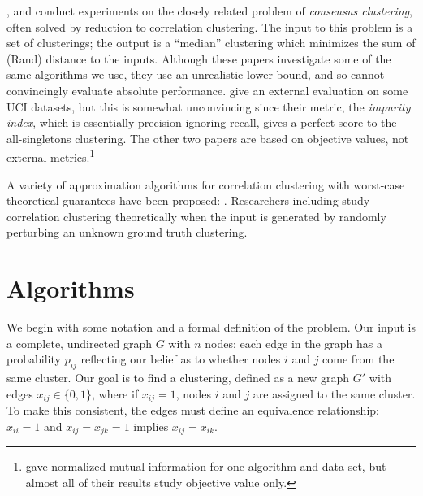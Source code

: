 \documentclass[11pt]{article}
\begin{document}
,  and 
conduct experiments on the closely related problem of \emph{consensus
  clustering}, often solved by reduction to correlation
clustering. The input to this problem is a set of clusterings; the
output is a ``median'' clustering which minimizes the sum of (Rand)
distance to the inputs. Although these papers investigate some of the
same algorithms we use, they use an unrealistic lower bound, and so
cannot convincingly evaluate absolute performance. 
give an external evaluation on some UCI datasets, but this is
somewhat unconvincing since their metric, the {\em impurity index},
which is essentially precision ignoring recall, gives a perfect score to
the all-singletons clustering. The other two papers are based on objective values, not external metrics.\footnote{ gave normalized mutual information for one algorithm and data set, but almost all of their results study objective value only.}

A variety of approximation algorithms for correlation clustering with
worst-case theoretical guarantees have been proposed:
\cite{Bansal04,Ailon08,Demaine06,Charikar05,Giotis06}. Researchers
including \cite{BenDor99,Joachims05,Mathieu08a} study correlation
clustering theoretically when the input is generated by randomly
perturbing an unknown ground truth clustering. %

\section{Algorithms}

We begin with some notation and a formal definition of the
problem. Our input is a complete, undirected graph $G$ with $n$ nodes;
each edge in the graph has a probability $p_{ij}$ reflecting our
belief as to whether nodes $i$ and $j$ come from the same cluster. Our
goal is to find a clustering, defined as a new graph $G'$ with edges
$x_{ij} \in \{0,1\}$, where if $x_{ij} = 1$, nodes $i$ and $j$ are
assigned to the same cluster. To make this consistent, the edges must
define an equivalence relationship: $x_{ii} = 1$ and $x_{ij} = x_{jk}
= 1$ implies $x_{ij} = x_{ik}$.
\end{document}
